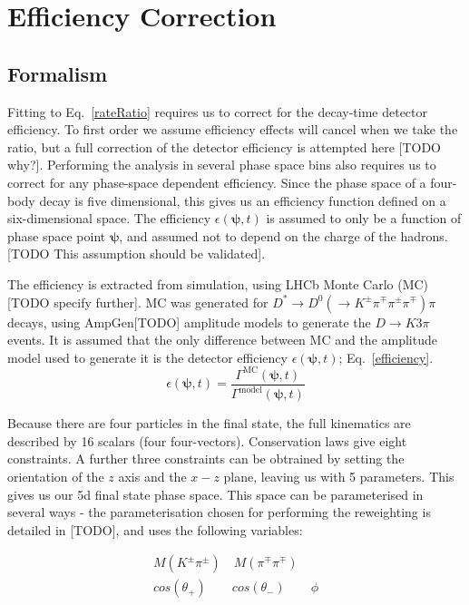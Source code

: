 \documentclass[note.tex]{subfiles}
\begin{document}
\section{Efficiency Correction}
\subsection{Formalism}
Fitting to Eq.~\ref{rateRatio} requires us to correct for the decay-time detector efficiency.
To first order we assume efficiency effects will cancel when we take the ratio, but a full correction of the detector efficiency is attempted here [TODO why?].
Performing the analysis in several phase space bins also requires us to correct for any phase-space dependent efficiency.
Since the phase space of a four-body decay is five dimensional, this gives us an efficiency function defined on a six-dimensional space.
The efficiency $\epsilon(\mathbf{\psi}, t)$ is assumed to only be a function of phase space point $\mathbf{\psi}$, and assumed not to depend on the charge of the hadrons.
[TODO This assumption should be validated].

The efficiency is extracted from simulation, using LHCb Monte Carlo (MC) [TODO specify further].
MC was generated for $D^* \rightarrow D^0(\rightarrow K^\pm \pi^\mp \pi^\pm \pi^\mp)\pi$ decays, using AmpGen[TODO] amplitude models to generate the $D\rightarrow K 3\pi$ events.
It is assumed that the only difference between MC and the amplitude model used to generate it is the detector efficiency $\epsilon(\mathbf{\psi}, t)$; Eq.~\ref{efficiency}.
\begin{equation}
    \epsilon(\mathbf{\psi}, t) = \frac{\Gamma^{\mathrm{MC}}(\mathbf{\psi}, t)}{\Gamma^{\mathrm{model}}(\mathbf{\psi}, t)}
    \label{efficiency}
\end{equation}

Because there are four particles in the final state, the full kinematics are described by 16 scalars (four four-vectors).
Conservation laws give eight constraints.
A further three constraints can be obtrained by setting the orientation of the $z$ axis and the $x-z$ plane, leaving us with 5 parameters.
This gives us our 5d final state phase space.
This space can be parameterised in several ways - the parameterisation chosen for performing the reweighting is detailed in [TODO], and uses the following variables:

\begin{equation}
    \label{CM Parameterisation}
    \begin{aligned}
        M(K^\pm\pi^\pm)\quad
        M(\pi^\mp\pi^\mp) \\
        cos(\theta_+)\qquad
        cos(\theta_-)\qquad
        \phi
    \end{aligned}
\end{equation}
\end{document}
